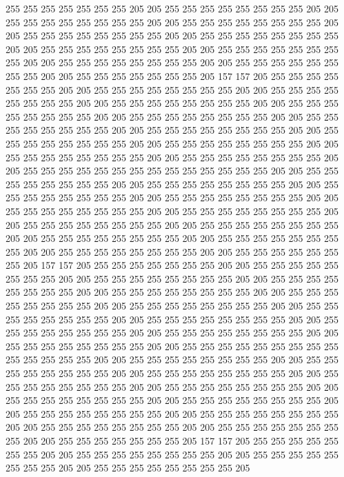 255 255 255 255 255 255 255 205 205 255 255 255 255 255 255 255 255 205 205 255
255 255 255 255 255 255 255 205 205 255 255 255 255 255 255 255 255 205 205 255
255 255 255 255 255 255 255 205 205 255 255 255 255 255 255 255 255 205 205 255
255 255 255 255 255 255 255 205 205 255 255 255 255 255 255 255 255 205 205 255
255 255 255 255 255 255 255 205 205 255 255 255 255 255 255 255 255 205 205 255
255 255 255 255 255 255 205 157 157 205 255 255 255 255 255 255 255 205 205 255
255 255 255 255 255 255 255 205 205 255 255 255 255 255 255 255 255 205 205 255
255 255 255 255 255 255 255 205 205 255 255 255 255 255 255 255 255 205 205 255
255 255 255 255 255 255 255 205 205 255 255 255 255 255 255 255 255 205 205 255
255 255 255 255 255 255 255 205 205 255 255 255 255 255 255 255 255 205 205 255
255 255 255 255 255 255 255 205 205 255 255 255 255 255 255 255 255 205 205 255
255 255 255 255 255 255 255 205 205 255 255 255 255 255 255 255 255 255 255 255
255 255 255 205 205 255 255 255 255 255 255 255 255 205 205 255 255 255 255 255
255 255 255 205 205 255 255 255 255 255 255 255 255 205 205 255 255 255 255 255
255 255 255 205 205 255 255 255 255 255 255 255 255 205 205 255 255 255 255 255
255 255 255 205 205 255 255 255 255 255 255 255 255 205 205 255 255 255 255 255
255 255 255 205 205 255 255 255 255 255 255 255 255 205 205 255 255 255 255 255
255 255 255 205 205 255 255 255 255 255 255 255 255 205 205 255 255 255 255 255
255 255 205 157 157 205 255 255 255 255 255 255 255 205 205 255 255 255 255 255
255 255 255 205 205 255 255 255 255 255 255 255 255 205 205 255 255 255 255 255
255 255 255 205 205 255 255 255 255 255 255 255 255 205 205 255 255 255 255 255
255 255 255 205 205 255 255 255 255 255 255 255 255 205 205 255 255 255 255 255
255 255 255 205 205 255 255 255 255 255 255 255 255 205 205 255 255 255 255 255
255 255 255 205 205 255 255 255 255 255 255 255 255 205 205 255 255 255 255 255
255 255 255 205 205 255 255 255 255 255 255 255 255 255 255 255 255 255 255 205
205 255 255 255 255 255 255 255 255 205 205 255 255 255 255 255 255 255 255 205
205 255 255 255 255 255 255 255 255 205 205 255 255 255 255 255 255 255 255 205
205 255 255 255 255 255 255 255 255 205 205 255 255 255 255 255 255 255 255 205
205 255 255 255 255 255 255 255 255 205 205 255 255 255 255 255 255 255 255 205
205 255 255 255 255 255 255 255 255 205 205 255 255 255 255 255 255 255 255 205
205 255 255 255 255 255 255 255 255 205 205 255 255 255 255 255 255 255 205 157
157 205 255 255 255 255 255 255 255 205 205 255 255 255 255 255 255 255 255 205
205 255 255 255 255 255 255 255 255 205 205 255 255 255 255 255 255 255 255 205
